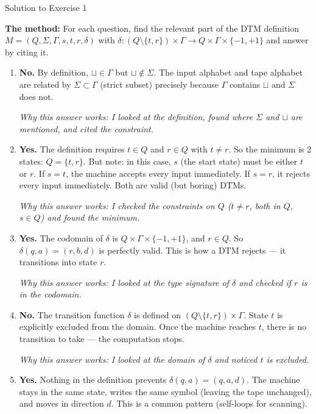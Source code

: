 \documentclass[11pt,a4paper]{article}
\newcommand{\blank}{\sqcup}
\begin{document}
\begin{solutionbox}{Solution to Exercise 1}

\textbf{The method:} For each question, find the relevant part of the DTM definition $M = (Q, \Sigma, \Gamma, s, t, r, \delta)$ with $\delta : (Q \setminus \{t,r\}) \times \Gamma \to Q \times \Gamma \times \{-1, +1\}$ and answer by citing it.

\begin{enumerate}
    \item \textbf{No.} By definition, $\blank \in \Gamma$ but $\blank \notin \Sigma$. The input alphabet and tape alphabet are related by $\Sigma \subset \Gamma$ (strict subset) precisely because $\Gamma$ contains $\blank$ and $\Sigma$ does not.

    \textit{Why this answer works: I looked at the definition, found where $\Sigma$ and $\blank$ are mentioned, and cited the constraint.}

    \item \textbf{Yes.} The definition requires $t \in Q$ and $r \in Q$ with $t \neq r$. So the minimum is 2 states: $Q = \{t, r\}$. But note: in this case, $s$ (the start state) must be either $t$ or $r$. If $s = t$, the machine accepts every input immediately. If $s = r$, it rejects every input immediately. Both are valid (but boring) DTMs.

    \textit{Why this answer works: I checked the constraints on $Q$ ($t \neq r$, both in $Q$, $s \in Q$) and found the minimum.}

    \item \textbf{Yes.} The codomain of $\delta$ is $Q \times \Gamma \times \{-1, +1\}$, and $r \in Q$. So $\delta(q, a) = (r, b, d)$ is perfectly valid. This is how a DTM rejects --- it transitions into state $r$.

    \textit{Why this answer works: I looked at the type signature of $\delta$ and checked if $r$ is in the codomain.}

    \item \textbf{No.} The transition function $\delta$ is defined on $(Q \setminus \{t,r\}) \times \Gamma$. State $t$ is explicitly excluded from the domain. Once the machine reaches $t$, there is no transition to take --- the computation stops.

    \textit{Why this answer works: I looked at the domain of $\delta$ and noticed $t$ is excluded.}

    \item \textbf{Yes.} Nothing in the definition prevents $\delta(q, a) = (q, a, d)$. The machine stays in the same state, writes the same symbol (leaving the tape unchanged), and moves in direction $d$. This is a common pattern (self-loops for scanning).


\end{enumerate}
\end{solutionbox}
\end{document}
